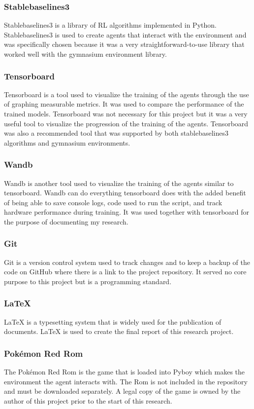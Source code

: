 \subsubsection*{Stablebaselines3}
Stablebaselines3 is a library of RL algorithms implemented in Python. Stablebaselines3 is used to create agents that interact with the environment and was specifically chosen because it was a very straightforward-to-use library that worked well with the gymnasium environment library.

\subsubsection*{Tensorboard}
Tensorboard is a tool used to visualize the training of the agents through the use of graphing measurable metrics. It was used to compare the performance of the trained models. Tensorboard was not necessary for this project but it was a very useful tool to visualize the progression of the training of the agents. Tensorboard was also a recommended tool that was supported by both stablebaselines3 algorithms and gymnasium environments.

\subsubsection*{Wandb}
Wandb is another tool used to visualize the training of the agents similar to tensorboard. Wandb can do everything tensorboard does with the added benefit of being able to save console logs, code used to run the script, and track hardware performance during training. It was used together with tensorboard for the purpose of documenting my research.

\subsubsection*{Git}
Git is a version control system used to track changes and to keep a backup of the code on GitHub where there is a link to the project repository. It served no core purpose to this project but is a programming standard. 

\subsubsection*{LaTeX}
LaTeX is a typesetting system that is widely used for the publication of documents. LaTeX is used to create the final report of this research project.

\subsubsection*{Pokémon Red Rom}
The Pokémon Red Rom is the game that is loaded into Pyboy which makes the environment the agent interacts with. The Rom is not included in the repository and must be downloaded separately. A legal copy of the game is owned by the author of this project prior to the start of this research.


